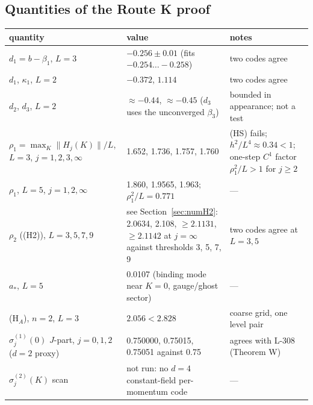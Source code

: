 \subsection{Quantities of the Route K proof}\label{sec:routeKnum}
\begin{longtable}{|p{5cm}|p{4.6cm}|p{5.4cm}|}
\hline
quantity & value & notes \\ \hline
$d_1=b-\beta_1$, $L=3$ & $-0.256\pm0.01$ (fits $-0.254\dots-0.258$) & two codes agree \\ \hline
$d_1$, $\kappa_1$, $L=2$ & $-0.372$, $1.114$ & two codes agree \\ \hline
$d_2$, $d_3$, $L=2$ & $\approx-0.44$, $\approx-0.45$ ($d_3$ uses the unconverged $\beta_3$) & bounded in appearance; not a test \\ \hline
$\rho_1=\max_K\|H_j(K)\|/L$, $L=3$, $j=1,2,3,\infty$ & 1.652, 1.736, 1.757, 1.760 & (HS) fails; $h^2/L^4\approx0.34<1$; one-step $C^1$ factor $\rho_1^2/L>1$ for $j\ge2$ \\ \hline
$\rho_1$, $L=5$, $j=1,2,\infty$ & 1.860, 1.9565, 1.963; $\rho_1^2/L=0.771$ & --- \\ \hline
$\rho_2$ ((H2)), $L=3,5,7,9$ & see Section~\ref{sec:numH2}: 2.0634, 2.108, $\ge2.1131$, $\ge2.1142$ at $j=\infty$ against thresholds 3, 5, 7, 9 & two codes agree at $L=3,5$ \\ \hline
$a_*$, $L=5$ & 0.0107 (binding mode near $K=0$, gauge/ghost sector) & --- \\ \hline
(H$_A$), $n=2$, $L=3$ & $2.056<2.828$ & coarse grid, one level pair \\ \hline
$\sigma_j^{(1)}(0)$ $J$-part, $j=0,1,2$ ($d=2$ proxy) & 0.750000, 0.75015, 0.75051 against 0.75 & agrees with L-308 (Theorem W) \\ \hline
$\sigma_j^{(2)}(K)$ scan & not run: no $d=4$ constant-field per-momentum code & --- \\ \hline
\end{longtable}

